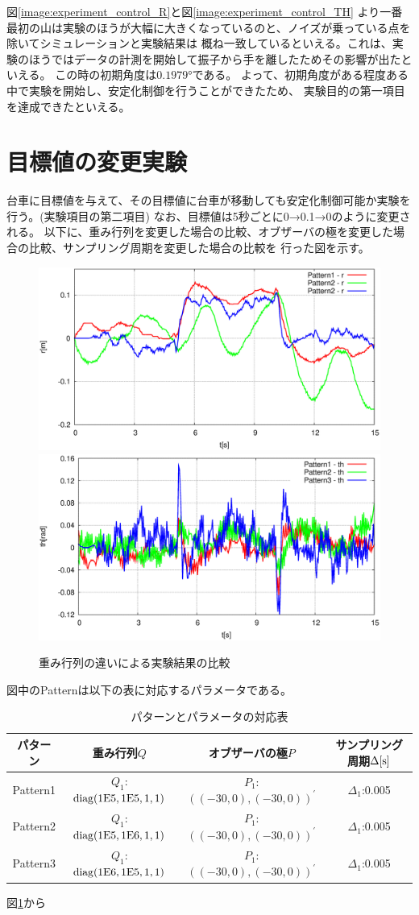 	図\ref{image:experiment_control_R}と図\ref{image:experiment_control_TH}
	より一番最初の山は実験のほうが大幅に大きくなっているのと、ノイズが乗っている点を除いてシミュレーションと実験結果は
	概ね一致しているといえる。これは、実験のほうではデータの計測を開始して振子から手を離したためその影響が出たといえる。
	この時の初期角度は$0.1979°$である。%
	よって、初期角度がある程度ある中で実験を開始し、安定化制御を行うことができたため、
	実験目的の第一項目を達成できたといえる。
	
	
	
\section{目標値の変更実験}
	台車に目標値を与えて、その目標値に台車が移動しても安定化制御可能か実験を行う。(実験項目の第二項目)
	なお、目標値は5秒ごとに0→0.1→0のように変更される。
	以下に、重み行列を変更した場合の比較、オブザーバの極を変更した場合の比較、サンプリング周期を変更した場合の比較を
	行った図を示す。
	\begin{figure}[H]
		\centering
		\includegraphics[width=0.4\linewidth]{gazo/Compare_Q_R.eps}
		\includegraphics[width=0.4\linewidth]{gazo/Compare_Q_TH.eps}
		\caption{重み行列の違いによる実験結果の比較}
		\label{image:comp_Q}
	\end{figure}
	図中のPatternは以下の表に対応するパラメータである。
	\begin{table}[H]
		\begin{center}
			\caption{パターンとパラメータの対応表}
			\medskip
			
			\begin{tabular}{|c|c|c|c|}\hline
				パターン & 重み行列$Q$ & オブザーバの極$P$ & サンプリング周期$\Delta[\rm{s}]$ \\ \hline\hline
				Pattern1 & $Q_1$:$\rm{diag}(1E5,1E5,1,1)$ & $P_1$:$((-30,0),(-30,0))^{'}$ & $\Delta_1$:0.005 \\ \hline
				Pattern2 & $Q_1$:$\rm{diag}(1E5,1E6,1,1)$ & $P_1$:$((-30,0),(-30,0))^{'}$ & $\Delta_1$:0.005 \\ \hline
				Pattern3 & $Q_1$:$\rm{diag}(1E6,1E5,1,1)$ & $P_1$:$((-30,0),(-30,0))^{'}$ & $\Delta_1$:0.005 \\ \hline
			\end{tabular}
		\end{center}
		\label{table:huriage_control}
	\end{table}
	図\ref{image:comp_Q}から
	
